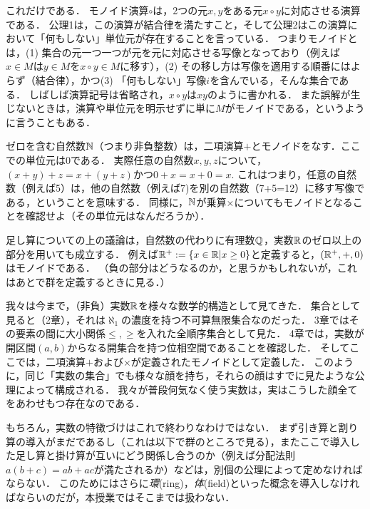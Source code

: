 \documentclass[11pt,a4paper]{jsarticle}
\begin{document}
これだけである．
モノイド演算$\circ$は，2つの元$x,y$をある元$x \circ y$に対応させる演算である．
公理1は，この演算が結合律を満たすこと，そして公理2はこの演算において「何もしない」単位元が存在することを言っている．
つまりモノイドとは，(1) 集合の元一つ一つが元を元に対応させる写像となっており（例えば$x\in M$は$y \in M$を$x\circ y \in M$に移す），(2) その移し方は写像を適用する順番にはよらず（結合律），かつ(3) 「何もしない」写像$i$を含んでいる，そんな集合である．
しばしば演算記号は省略され，$x \circ y$は$xy$のように書かれる．
また誤解が生じないときは，演算や単位元を明示せずに単に$M$がモノイドである，というように言うこともある．


\begin{example}
ゼロを含む自然数$\mathbb{N}$（つまり非負整数）は，二項演算$+$とモノイドをなす．ここでの単位元は$0$である．
実際任意の自然数$x, y, z$について，$(x+y)+z = x + (y+z)$かつ$0 + x = x + 0 = x$. 
これはつまり，任意の自然数（例えば5）は，他の自然数（例えば7)を別の自然数（7+5=12）に移す写像である，ということを意味する．
同様に，$\mathbb{N}$が乗算$\times$についてもモノイドとなることを確認せよ（その単位元はなんだろうか）．
\end{example}

\begin{example}
足し算についての上の議論は，自然数の代わりに有理数$\mathbb{Q}$，実数$\mathbb{R}$のゼロ以上の部分を用いても成立する．
例えば$\mathbb{R}^+ := \{ x \in \mathbb{R} | x \geq 0 \}$と定義すると，$(\mathbb{R}^+, +, 0)$はモノイドである．
（負の部分はどうなるのか，と思うかもしれないが，これはあとで群を定義するときに見る．）
\end{example}


我々は今まで，（非負）実数$\mathbb{R}$を様々な数学的構造として見てきた．
集合として見ると（2章），それは$\aleph_1$の濃度を持つ不可算無限集合なのだった．
3章ではその要素の間に大小関係$\leq, \geq$を入れた全順序集合として見た．
4章では，実数が開区間$(a,b)$からなる開集合を持つ位相空間であることを確認した．
そしてここでは，二項演算$+$および$\times$が定義されたモノイドとして定義した．
このように，同じ「実数の集合」でも様々な顔を持ち，それらの顔はすでに見たような公理によって構成される．
我々が普段何気なく使う実数は，実はこうした顔全てをあわせもつ存在なのである．

\begin{develop}
 もちろん，実数の特徴づけはこれで終わりなわけではない．
 まず引き算と割り算の導入がまだであるし（これは以下で群のところで見る），またここで導入した足し算と掛け算が互いにどう関係し合うのか（例えば分配法則$a(b+c) = ab + ac$が満たされるか）などは，別個の公理によって定めなければならない．
 このためにはさらに\emph{環}(ring)，\emph{体}(field)といった概念を導入しなければならいのだが，本授業ではそこまでは扱わない．
\end{develop}
\end{document}
